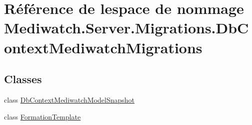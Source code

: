 \hypertarget{namespace_mediwatch_1_1_server_1_1_migrations_1_1_db_context_mediwatch_migrations}{}\section{Référence de l\textquotesingle{}espace de nommage Mediwatch.\+Server.\+Migrations.\+Db\+Context\+Mediwatch\+Migrations}
\label{namespace_mediwatch_1_1_server_1_1_migrations_1_1_db_context_mediwatch_migrations}
\subsection*{Classes}
\begin{DoxyCompactItemize}
\item 
class \hyperlink{class_mediwatch_1_1_server_1_1_migrations_1_1_db_context_mediwatch_migrations_1_1_db_context_mediwatch_model_snapshot}{Db\+Context\+Mediwatch\+Model\+Snapshot}
\item 
class \hyperlink{class_mediwatch_1_1_server_1_1_migrations_1_1_db_context_mediwatch_migrations_1_1_formation_template}{Formation\+Template}
\end{DoxyCompactItemize}
